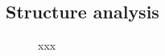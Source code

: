\documentclass[draft]{aa}
\begin{document}
\begin{appendix}
\section{Structure analysis}




 \begin{figure}
  \caption{xxx}
  \label{fig:12struct}
 \end{figure}



\end{appendix}
\end{document}
